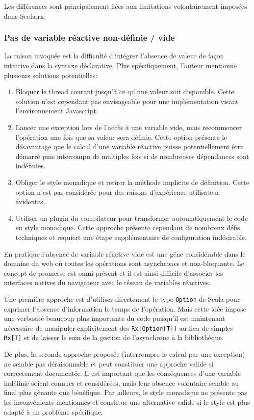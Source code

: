 Les différences sont principalement liées aux limitations volontairement imposées dans Scala.rx.

\subsubsection{Pas de variable réactive non-définie / vide}
La raison invoquée est la difficulté d'intégrer l'absence de valeur de façon intuitive dans la syntaxe déclarative. Plus spécifiquement, l'auteur mentionne plusieurs solutions potentielles:
\begin{enumerate}
	\item Bloquer le thread courant jusqu'à ce qu'une valeur soit disponible. Cette solution n'est cependant pas envisageable pour une implémentation visant l'environnement Javascript.
	\item Lancer une exception lors de l'accès à une variable vide, mais recommencer l'opération une fois que sa valeur sera définie. Cette option présente le désavantage que le calcul d'une variable réactive puisse potentiellement être démarré puis interrompu de multiples fois si de nombreuses dépendances sont indéfinies.
	\item Obliger le style monadique et retirer la méthode implicite de définition. Cette option n'est pas considérée pour des raisons d'expérience utilisateur évidentes.
	\item Utiliser un plugin du compilateur pour transformer automatiquement le code en style monadique. Cette approche présente cependant de nombreux défis techniques et requiert une étape supplémentaire de configuration indésirable.
\end{enumerate}

En pratique l'absence de variable réactive vide est une gêne considérable dans le domaine du web où toutes les opérations sont asynchrones et non-bloquante. Le concept de promesse est omni-présent et il est ainsi difficile d'associer les interfaces natives du navigateur avec le réseau de variables réactives.

Une première approche est d'utiliser directement le type \texttt{Option} de Scala pour exprimer l'absence d'information le temps de l'opération. Mais cette idée impose une verbosité beaucoup plus importante du code puisqu'il est maintenant nécessaire de manipuler explicitement des \texttt{Rx[Option[T]]} au lieu de simples \texttt{Rx[T]} et de laisser le soin de la gestion de l'asynchrone à la bibliothèque.

De plus, la seconde approche proposée (interrompre le calcul par une exception) ne semble pas déraisonnable et peut constituer une approche valide si correctement documentée. Il est important que les conséquences d'une variable indéfinie soient connues et considérées, mais leur absence volontaire semble au final plus gênante que bénéfique. Par ailleurs, le style monadique ne présente pas les inconvénients mentionnés et constitue une alternative valide si le style est plus adapté à un problème spécifique.

